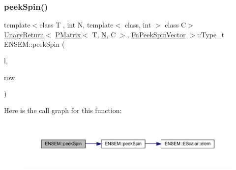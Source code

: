 \subsubsection{\texorpdfstring{peekSpin()}{peekSpin()}\hspace{0.1cm}{\footnotesize\ttfamily [1/2]}}
{\footnotesize\ttfamily template$<$class T , int N, template$<$ class, int $>$ class C$>$ \\
\mbox{\hyperlink{structENSEM_1_1UnaryReturn}{Unary\+Return}}$<$ \mbox{\hyperlink{classENSEM_1_1PMatrix}{P\+Matrix}}$<$ T, \mbox{\hyperlink{operator__name__util_8cc_a7722c8ecbb62d99aee7ce68b1752f337}{N}}, C $>$, \mbox{\hyperlink{structENSEM_1_1FnPeekSpinVector}{Fn\+Peek\+Spin\+Vector}} $>$\+::Type\+\_\+t E\+N\+S\+E\+M\+::peek\+Spin (\begin{DoxyParamCaption}\item[{const \mbox{\hyperlink{classENSEM_1_1PMatrix}{P\+Matrix}}$<$ T, \mbox{\hyperlink{operator__name__util_8cc_a7722c8ecbb62d99aee7ce68b1752f337}{N}}, C $>$ \&}]{l,  }\item[{int}]{row }\end{DoxyParamCaption})\hspace{0.3cm}{\ttfamily [inline]}}

Here is the call graph for this function\+:\nopagebreak
\begin{figure}[H]
\begin{center}
\leavevmode
\includegraphics[width=350pt]{df/d0a/group__primmatrix_gaf26619f85146d483d1c177abf5c2f476_cgraph}
\end{center}
\end{figure}
\mbox{\label{group__primmatrix_ga2efe19b2ef4dc4cbacc12117645bf8b8}} 
